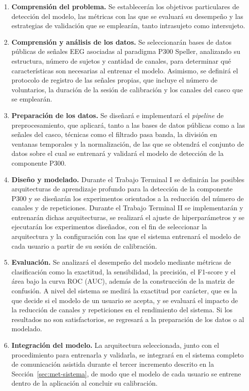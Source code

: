 \begin{enumerate}
  \item \textbf{Comprensión del problema.} Se establecerán los objetivos particulares de detección
  del modelo, las métricas con las que se evaluará su desempeño y las estrategias de validación que
  se emplearán, tanto intrasujeto como intersujeto.
  \item \textbf{Comprensión y análisis de los datos.} Se seleccionarán bases de datos públicas de
  señales EEG asociadas al paradigma P300 Speller, analizando su estructura, número de sujetos y
  cantidad de canales, para determinar qué características son necesarias al entrenar el
  modelo. Asimismo, se definirá el protocolo de registro de las señales propias, que incluye el
  número de voluntarios, la duración de la sesión de calibración y los canales del casco que se
  emplearán.
  \item \textbf{Preparación de los datos.} Se diseñará e implementará el \textit{pipeline} de
  preprocesamiento, que aplicará, tanto a las bases de datos públicas como a las señales del casco,
  técnicas como el filtrado pasa banda, la división en ventanas
  temporales y la normalización, de las que se obtendrá el conjunto de datos sobre el cual se
  entrenará y validará el modelo de detección de la componente P300.
  \item \textbf{Diseño y modelado.} Durante el Trabajo Terminal I se definirán las posibles
  arquitecturas de aprendizaje profundo para la detección de la componente P300 y se diseñarán los
  experimentos orientados a la reducción del número de canales y de repeticiones. Durante el
  Trabajo Terminal II se implementarán y entrenarán dichas arquitecturas, se realizará el ajuste de
  hiperparámetros y se ejecutarán los experimentos diseñados, con el fin de seleccionar la
  arquitectura y la configuración con las que el sistema entrenará el modelo de cada usuario a
  partir de su sesión de calibración.
  \item \textbf{Evaluación.} Se analizará el desempeño del modelo mediante métricas de
  clasificación como la exactitud, la sensibilidad, la precisión, el F1-score y el área bajo la curva
  ROC (AUC), además de la construcción de la matriz de confusión. A nivel del sistema se medirá la
  exactitud por carácter, que es la que decide si el modelo de un usuario se acepta, y se evaluará el impacto de la reducción de canales y
  repeticiones en el rendimiento del sistema. Si los resultados no son satisfactorios, se regresará
  a la preparación de los datos o al modelado.
  \item \textbf{Integración del modelo.} La arquitectura seleccionada, junto con el procedimiento
  para entrenarla y validarla, se integrará en el sistema completo de comunicación asistida durante
  el tercer incremento descrito en la Sección~\ref{sec:met-sistema}, de modo que el modelo de cada
  usuario se entrene dentro de la aplicación al concluir su calibración.
\end{enumerate}

